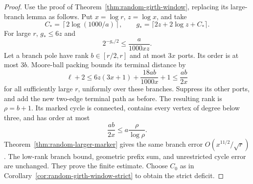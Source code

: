 \begin{proof}
Use the proof of Theorem~\ref{thm:random-girth-window}, replacing its large-branch lemma as follows.
Put $x=\log r$, $z=\log x$, and take
\[
 C_*=\left\lceil2\log(1000/a)\right\rceil,\qquad
 g_*=\lceil2z+2\log z+C_*\rceil.
\]
For large $r$, $g_*\le6z$ and
\[
 2^{-g_*/2}\le\frac{a}{1000xz}.
\]
Let a branch pole have rank $b\in[r/2,r]$ and at most $3x$ ports.
Its order is at most $3b$.
Moore-ball packing bounds its terminal distance by
\[
 \ell+2
 \le6z(3x+1)+\frac{18ab}{1000x}+1
 \le\frac{ab}{2x}
\]
for all sufficiently large $r$, uniformly over these branches.
Suppress its other ports, and add the new two-edge terminal path as before.
The resulting rank is $\rho=b+1$.
Its marked cycle is connected, contains every vertex of degree below three, and has order at most
\[
 \frac{ab}{2x}\le a\frac{\rho}{\log\rho}.
\]
Theorem~\ref{thm:random-larger-marker} gives the same branch error
$O(x^{11/2}/\sqrt r)$.
The low-rank branch bound, geometric prefix sum, and unrestricted cycle error are unchanged.
They prove the finite estimate.
Choose $C_0$ as in Corollary~\ref{cor:random-girth-window-strict} to obtain the strict deficit.
\end{proof}
